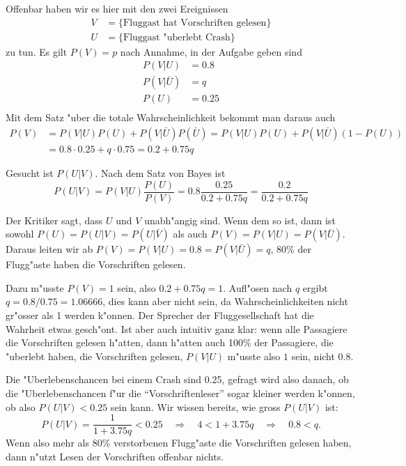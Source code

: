\begin{loesung}
Offenbar haben wir es hier mit den zwei Ereignissen
\begin{align*}
V&=\{\text{Fluggast hat Vorschriften gelesen}\}
\\
U&=\{\text{Fluggast "uberlebt Crash}\}
\end{align*}
zu tun. Es gilt $P(V)=p$ nach Annahme, in der Aufgabe geben sind
\begin{align*}
P(V|U)&=0.8\\
P(V|\bar U)&=q\\
P(U)&=0.25\\
\end{align*}
Mit dem Satz "uber die totale Wahrscheinlichkeit bekommt man daraus auch
\begin{align*}
P(V)
&=
P(V|U)P(U)+P(V|\bar U)P(\bar U)
=
P(V|U)P(U)+P(V|\bar U)(1-P(U))
\\
&=
0.8\cdot0.25 +q\cdot 0.75
=0.2+ 0.75q
\end{align*}
\begin{teilaufgaben}
\item
Gesucht ist $P(U|V)$.
Nach dem Satz von Bayes ist
\begin{equation}
P(U|V)=P(V|U)\frac{P(U)}{P(V)}
=0.8 \frac{0.25}{0.2+0.75q}
=\frac{0.2}{0.2+0.75q}
\label{pq}
\end{equation}
\item
Der Kritiker sagt, dass $U$ und $V$ unabh"angig sind. Wenn dem so
ist, dann ist sowohl
$P(U)=P(U|V)=P(U|\bar V)$
als auch
$P(V)=P(V|U)=P(V|\bar U)$.
Daraus leiten wir ab $P(V)=P(V|U)=0.8=P(V|\bar U)=q$, 80\% der
Flugg"aste haben die Vorschriften gelesen.
\item
Dazu m"usste $P(V)=1$ sein, also
$0.2+0.75q=1$.
Aufl"osen nach $q$ ergibt $q=0.8/0.75=1.06666$, dies kann aber nicht
sein, da Wahrscheinlichkeiten nicht gr"osser als 1 werden k"onnen.
Der Sprecher der Fluggesellschaft hat die Wahrheit etwas gesch"ont.
Ist aber auch intuitiv ganz klar: wenn alle Passagiere die Vorschriften
gelesen h"atten, dann h"atten auch 100\% der Passagiere, die
"uberlebt haben, die Vorschriften gelesen, $P(V|U)$ m"usste also $1$
sein, nicht $0.8$.
\item
Die "Uberlebenschancen bei einem Crash sind 0.25, gefragt wird
also danach, ob die "Uberlebenschancen f"ur die ``Vorschriftenleser''
sogar kleiner werden k"onnen, ob also $P(U|V)<0.25$ sein kann. Wir
wissen bereits, wie gross
$P(U|V)$ ist:
\[
P(U|V)=\frac{1}{1+3.75q}<0.25
\quad
\Rightarrow
\quad
4<1+3.75q
\quad
\Rightarrow
\quad
0.8<q.
\]
Wenn also mehr als 80\% verstorbenen Flugg"aste die Vorschriften
gelesen haben, dann n"utzt Lesen der Vorschriften offenbar
nichts.
\end{teilaufgaben}
\end{loesung}

